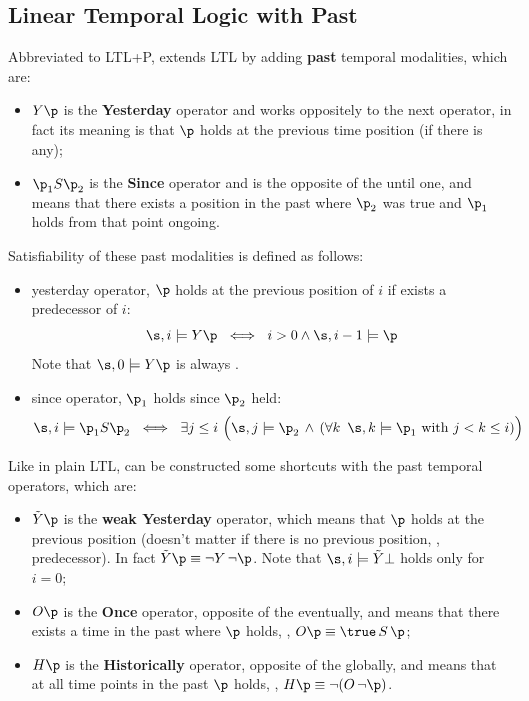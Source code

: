 \documentclass[oneside]{academica}
\begin{document}
\subsection{Linear Temporal Logic with Past}

Abbreviated to LTL+P, extends LTL by adding \textbf{past} temporal modalities, which are:
\begin{itemize}
  \item $Y\p$ is the \textbf{Yesterday} operator and works oppositely to the next operator, in fact its meaning is that $\p$ holds at the previous time position (if there is any);
  \item $\p_1 S \p_2$ is the \textbf{Since} operator and is the opposite of the until one, and means that there exists a position in the past where $\p_2$ was true and $\p_1$ holds from that point ongoing.
\end{itemize}
Satisfiability of these past modalities is defined as follows:
\begin{itemize}
  \item yesterday operator, $\p$ holds at the previous position of $i$ if exists a predecessor of $i$:
    \begin{equation*}
      \s,i \models Y\p \ \iff\ i>0 \land \s,i-1 \models \p
    \end{equation*}
    Note that $\s,0 \models Y\p$ is always \false.
  \item since operator, $\p_1$ holds since $\p_2$ held:
    \begin{equation*}
      \s,i \models \p_1 S \p_2 \ \iff\ \exists j \leq i \ \Big(\s,j \models \p_2 \,\land\, (\forall k\ \, \s,k \models \p_1 \text{ with } j < k \leq i)\Big)
    \end{equation*}
\end{itemize}
Like in plain LTL, can be constructed some shortcuts with the past temporal operators, which are:
\begin{itemize}
  \item $\wY \p$ is the \textbf{weak Yesterday} operator, which means that $\p$ holds at the previous position (doesn't matter if there is no previous position, \ie, predecessor). In fact $\wY \p \equiv \neg Y\, \neg\p$. Note that $\s,i \models \wY \bot$ holds only for $i = 0$;
  \item $O \p$ is the \textbf{Once} operator, opposite of the eventually, and means that there exists a time in the past where $\p$ holds, \ie, $O \p \equiv \true\, S\, \p$;
  \item $H \p$ is the \textbf{Historically} operator, opposite of the globally, and means that at all time points in the past $\p$ holds, \ie, $H \p \equiv \neg(O\, \neg\p)$.
\end{itemize}
\end{document}

